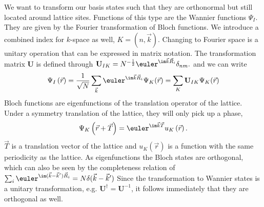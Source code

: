 We want to transform our basis states such that they are orthonormal but still located around lattice sites.
Functions of this type are the Wannier functions $\Psi_I$. They are given by the Fourier transformation of Bloch functions.
We introduce a combined index for $k$-space as well, $K=(n,\vec k)$.
Changing to Fourier space is a unitary operation that can be expressed in matrix notation.
The transformation matrix $\mathbf{U}$ is defined through 
$
 \mathbf{U}_{IK} = N^{-\frac12} \euler^{\im\vec k \vec R_i} \delta_{nm}.
$ and we can write
\begin{equation}
 \Psi_I \left( \vec{r} \right) = \frac1{\sqrt{N}} \sum_{\vec{k}} \euler^{\im \vec{k}\vec{R}_i } \Psi_K(\vec r) = \sum_{K} \mathbf{U}_{IK} \Psi_K(\vec r) 
\end{equation}
%
Bloch functions are eigenfunctions of the translation operator of the lattice. 
Under a symmetry translation of the lattice, they will only pick up a phase,
\begin{equation}
 \Psi_{K} \left( \vec{r}+\vec{T}\right) = \euler^{\im \vec{k} \vec{T} } u_{K} \left( \vec{r} \right). \label{BlochDef}
\end{equation}
$\vec T$ is a translation vector of the lattice and $u_{K} \left( \vec{r} \right)$ is a function with the same periodicity as the lattice. 
As eigenfunctions the Bloch states are orthogonal, 
which can also be seen by the completeness relation of $\sum_i \euler^{\im ( \vec k - \vec k^{\prime} ) \vec R_i} = N\delta (\vec k - \vec k^{\prime})$
Since the transformation to Wannier states is a unitary transformation, e.g. $\mathbf U^{\dagger} = \mathbf U^{-1}$, it follows immediately that they are orthogonal as well.

